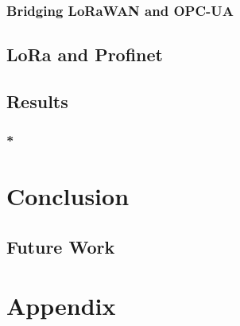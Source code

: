 \documentclass{book}
\begin{document}
\subsection{Bridging LoRaWAN and OPC-UA}
\section{LoRa and Profinet}
\section{Results}
\subsection{*}

\chapter{Conclusion}
\section{Future Work}

\chapter{Appendix}
\end{document}
